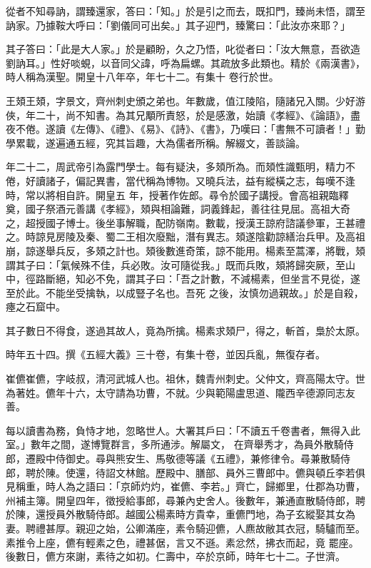 \begin{pinyinscope}
 從者不知尋訥，謂臻還家，答曰：「知。」於是引之而去，既扣門，臻尚未悟，謂至訥家。乃據鞍大呼曰：「劉儀同可出矣。」其子迎門，臻驚曰：「此汝亦來耶？」



 其子答曰：「此是大人家。」於是顧盼，久之乃悟，叱從者曰：「汝大無意，吾欲造劉訥耳。」性好啖蜆，以音同父諱，呼為扁螺。其疏放多此類也。精於《兩漢書》，時人稱為漢聖。開皇十八年卒，年七十二。有集十
 卷行於世。



 王頍王頍，字景文，齊州刺史頒之弟也。年數歲，值江陵陷，隨諸兄入關。少好游俠，年二十，尚不知書。為其兄顒所責怒，於是感激，始讀《孝經》、《論語》，盡夜不倦。遂讀《左傳》、《禮》、《易》、《詩》、《書》，乃嘆曰：「書無不可讀者！」勤學累載，遂遍通五經，究其旨趣，大為儒者所稱。解綴文，善談論。



 年二十二，周武帝引為露門學士。每有疑決，多頍所為。而頍性識甄明，精力不倦，好讀諸子，偏記異書，當代稱為博物。又曉兵法，益有縱橫之志，每嘆不逢時，常以將相自許。開皇五
 年，授著作佐郎。尋令於國子講授。會高祖親臨釋奠，國子祭酒元善講《孝經》，頍與相論難，詞義鋒起，善往往見屈。高祖大奇之，超授國子博士。後坐事解職，配防嶺南。數載，授漢王諒府諮議參軍，王甚禮之。時諒見房陵及秦、蜀二王相次廢黜，潛有異志。頍遂陰勸諒繕治兵甲。及高祖崩，諒遂舉兵反，多頍之計也。頍後數進奇策，諒不能用。楊素至蒿澤，將戰，頍謂其子曰：「氣候殊不佳，兵必敗。汝可隨從我。」既而兵敗，頍將歸突厥，至山中，徑路斷絕，知必不免，謂其子曰：「吾之計數，不減楊素，但坐言不見從，遂至於此。不能坐受擒執，以成豎子名也。吾死
 之後，汝慎勿過親故。」於是自殺，瘞之石窟中。



 其子數日不得食，遂過其故人，竟為所擒。楊素求頍尸，得之，斬首，梟於太原。



 時年五十四。撰《五經大義》三十卷，有集十卷，並因兵亂，無復存者。



 崔儦崔儦，字岐叔，清河武城人也。祖休，魏青州刺史。父仲文，齊高陽太守。世為著姓。儦年十六，太守請為功曹，不就。少與範陽盧思道、隴西辛德源同志友善。



 每以讀書為務，負恃才地，忽略世人。大署其戶曰：「不讀五千卷書者，無得入此室。」數年之間，遂博覽群言，多所通涉。解屬文，
 在齊舉秀才，為員外散騎侍郎，遷殿中侍御史。尋與熊安生、馬敬德等議《五禮》，兼修律令。尋兼散騎侍郎，聘於陳。使還，待詔文林館。歷殿中、膳部、員外三曹郎中。儦與頓丘李若俱見稱重，時人為之語曰：「京師灼灼，崔儦、李若。」齊亡，歸鄉里，仕郡為功曹，州補主簿。開皇四年，徵授給事郎，尋兼內史舍人。後數年，兼通直散騎侍郎，聘於陳，還授員外散騎侍郎。越國公楊素時方貴幸，重儦門地，為子玄縱娶其女為妻。聘禮甚厚。親迎之始，公卿滿座，素令騎迎儦，人麃故敝其衣冠，騎驢而至。素推令上座，儦有輕素之色，禮甚倨，言又不遜。素忿然，拂衣而起，竟
 罷座。後數日，儦方來謝，素待之如初。仁壽中，卒於京師，時年七十二。子世濟。




\end{pinyinscope}
